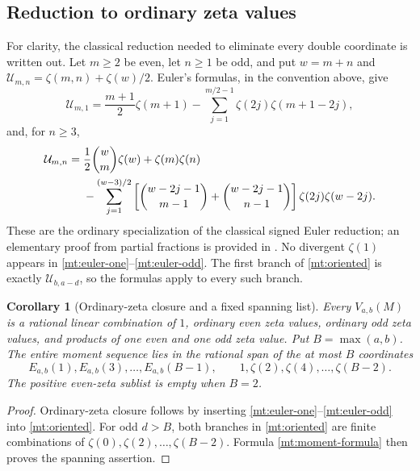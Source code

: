 \documentclass[11pt,letterpaper]{article}
\numberwithin{equation}{section}
\theoremstyle{plain}
\newtheorem{corollary}[theorem]{Corollary}
\theoremstyle{definition}
\theoremstyle{remark}
\begin{document}
\subsection{Reduction to ordinary zeta values}

For clarity, the classical reduction needed to eliminate every double
coordinate is written out. Let $m\ge2$ be even, let $n\ge1$ be odd,
and put $w=m+n$ and
$\mathcal U_{m,n}=\zeta(m,n)+\zeta(w)/2$. Euler's formulas, in the
convention above, give
\begin{equation}\label{mt:euler-one}
 \mathcal U_{m,1}=\frac{m+1}{2}\zeta(m+1)
  -\sum_{j=1}^{m/2-1}\zeta(2j)\zeta(m+1-2j),
\end{equation}
and, for $n\ge3$,
\begin{align}
 \mathcal U_{m,n}={}&\frac12\binom wm\zeta(w)+\zeta(m)\zeta(n)
 \notag\\
 &-\sum_{j=1}^{(w-3)/2}
  \left[\binom{w-2j-1}{m-1}+\binom{w-2j-1}{n-1}\right]
                      \zeta(2j)\zeta(w-2j).
 \label{mt:euler-odd}
\end{align}
These are the ordinary specialization of the classical signed Euler
reduction; an elementary proof from partial fractions is provided in
\cite[Eq.~(2)--(3) and Proposition~1]{Bradley2007}. No divergent
$\zeta(1)$ appears in \eqref{mt:euler-one}--\eqref{mt:euler-odd}.
The first branch of \eqref{mt:oriented} is exactly
$\mathcal U_{b,a-d}$, so the formulas apply to every such branch.

\begin{corollary}[Ordinary-zeta closure and a fixed spanning list]
\label{mt:closure}
Every $V_{a,b}(M)$ is a rational linear combination of $1$, ordinary
even zeta values, ordinary odd zeta values, and products of one even
and one odd zeta value. Put $B=\max(a,b)$. The entire moment sequence
lies in the rational span of the at most $B$ coordinates
\begin{equation}\label{mt:finite-span}
 E_{a,b}(1),E_{a,b}(3),\ldots,E_{a,b}(B-1),
 \qquad 1,\zeta(2),\zeta(4),\ldots,\zeta(B-2).
\end{equation}
The positive even-zeta sublist is empty when $B=2$.
\end{corollary}
\begin{proof}
Ordinary-zeta closure follows by inserting
\eqref{mt:euler-one}--\eqref{mt:euler-odd} into
\eqref{mt:oriented}. For odd $d>B$, both branches in
\eqref{mt:oriented} are finite combinations of
$\zeta(0),\zeta(2),\ldots,\zeta(B-2)$. Formula
\eqref{mt:moment-formula} then proves the spanning assertion.
\end{proof}
\end{document}
